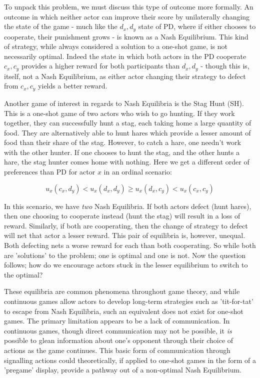 To unpack this problem, we must discuss this type of outcome more formally. An outcome in which neither actor can improve their score by unilaterally changing the state of the game - much like the $d_x,d_y$ state of PD, where if either chooses to cooperate, their punishment grows - is known as a Nash Equilibrium. This kind of strategy, while always considered a solution to a one-shot game, is not necessarily optimal. Indeed the state in which both actors in the PD cooperate $c_x,c_y$ provides a higher reward for both participants than $d_x,d_y$ - though this is, itself, not a Nash Equilibrium, as either actor changing their strategy to defect from $c_x,c_y$ yields a better reward.

Another game of interest in regards to Nash Equilibria is the Stag Hunt (SH). This is a one-shot game of two actors who wish to go hunting. If they work together, they can successfully hunt a stag, each taking home a large quantity of food. They are alternatively able to hunt hares which provide a lesser amount of food than their share of the stag. However, to catch a hare, one needn't work with the other hunter. If one chooses to hunt the stag, and the other hunts a hare, the stag hunter comes home with nothing. Here we get a different order of preferences than PD for actor $x$ in an ordinal scenario:

\[u_x(c_x,d_y) < u_x(d_x,d_y) \geq u_x(d_x,c_y) < u_x(c_x,c_y)\]

In this scenario, we have \textit{two} Nash Equilibria. If both actors defect (hunt hares), then one choosing to cooperate instead (hunt the stag) will result in a loss of reward. Similarly, if both are cooperating, then the change of strategy to defect will net that actor a lesser reward. This pair of equilibria is, however, unequal. Both defecting nets a worse reward for each than both cooperating. So while both are 'solutions' to the problem; one is optimal and one is not. Now the question follows; how do we encourage actors stuck in the lesser equilibrium to switch to the optimal?

These equilibria are common phenomena throughout game theory, and while continuous games allow actors to develop long-term strategies such as 'tit-for-tat' to escape from Nash Equilibria, such an equivalent does not exist for one-shot games. The primary limitation appears to be a lack of communication. In continuous games, though direct communication may not be possible, it \textit{is} possible to glean information about one's opponent through their choice of actions as the game continues. This basic form of communication through signalling actions could theoretically, if applied to one-shot games in the form of a 'pregame' display, provide a pathway out of a non-optimal Nash Equilibrium.

